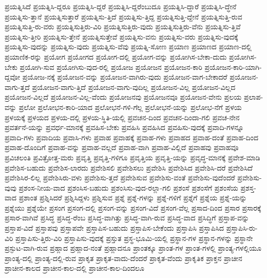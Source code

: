 {ಪ್ರಯತ್ನಿಸಿದೆ
ಪ್ರಯತ್ನಿಸಿ-ದ್ದರೂ
ಪ್ರಯತ್ನಿಸಿ-ದ್ದರೆ
ಪ್ರಯತ್ನಿಸಿ-ದ್ದರೆಂಬುದೂ
ಪ್ರಯತ್ನಿಸಿ-ದ್ದಾರೆ
ಪ್ರಯತ್ನಿಸಿ-ದ್ಧೇನೆ
ಪ್ರಯತ್ನಿಸು-ತ್ತಾನೆ
ಪ್ರಯತ್ನಿಸುತ್ತಾರೆ
ಪ್ರಯತ್ನಿಸು-ತ್ತಿದೆ
ಪ್ರಯತ್ನಿಸು-ತ್ತಿದ್ದ
ಪ್ರಯತ್ನಿಸುತ್ತಿ-ದ್ದೇನೆ
ಪ್ರಯತ್ನಿಸುತ್ತಿ-ರುವ
ಪ್ರಯತ್ನಿಸುತ್ತಿ-ರು-ವರು
ಪ್ರಯತ್ನಿಸುತ್ತಿರು-ವಿರಿ
ಪ್ರಯತ್ನಿಸುತ್ತಿರು-ವುದು
ಪ್ರಯತ್ನಿಸುತ್ತಿರು-ವೆನು
ಪ್ರಯತ್ನಿಸು-ತ್ತಿವೆ
ಪ್ರಯತ್ನಿಸು-ತ್ತೀರಿ
ಪ್ರಯತ್ನಿಸು-ತ್ತೇನೆ
ಪ್ರಯತ್ನಿಸುತ್ತೇವೆ
ಪ್ರಯತ್ನಿಸು-ವನು
ಪ್ರಯತ್ನಿಸು-ವರು
ಪ್ರಯತ್ನಿಸು-ವುದಕ್ಕೆ
ಪ್ರಯತ್ನಿಸು-ವುದನ್ನು
ಪ್ರಯತ್ನಿಸು-ವುದು
ಪ್ರಯತ್ನಿಸು-ವೆವು
ಪ್ರಯತ್ನಿ-ಸೋಣ
ಪ್ರಯಾಣ
ಪ್ರಯಾಣದ
ಪ್ರಯಾಣ-ದಲ್ಲಿ
ಪ್ರಯಾಣಿಕ-ರನ್ನು
ಪ್ರಯೋಗ
ಪ್ರಯೋಗದ
ಪ್ರಯೋಗ-ದಲ್ಲಿ
ಪ್ರಯೋಗ-ವನ್ನು
ಪ್ರಯೋಗಿಸ-ಬೇಕಾ-ದುದು
ಪ್ರಯೋಗಿಸ-ಬೇಕು
ಪ್ರಯೋಗಿ-ಸುವ
ಪ್ರಯೋಗಿಸು-ವುದ-ರಲ್ಲಿ
ಪ್ರಯೋಜ
ಪ್ರಯೋಜನ
ಪ್ರಯೋಜನ-ಕಾರಿ
ಪ್ರಯೋಜನ-ಕಾರಿ-ಯಾಗಿ-ದ್ದವೋ
ಪ್ರಯೋಜ-ನಕ್ಕೆ
ಪ್ರಯೋಜನ-ವನ್ನು
ಪ್ರಯೋಜನ-ವಾಗಿರು-ವುದು
ಪ್ರಯೋಜನ-ವಾಗ-ಬೇಕಾದರೆ
ಪ್ರಯೋಜನ-ವಾಗು-ತ್ತದೆ
ಪ್ರಯೋಜನ-ವಾಗು-ತ್ತಿದೆ
ಪ್ರಯೋಜನ-ವಾಗು-ವುದಿಲ್ಲ
ಪ್ರಯೋಜನ-ವಿಲ್ಲ
ಪ್ರಯೋಜನ-ವಿಲ್ಲದ
ಪ್ರಯೋಜನ-ವಿಲ್ಲದೆ
ಪ್ರಯೋಜನ-ವಿಲ್ಲ-ವೆಂದು
ಪ್ರಯೋಜನವು
ಪ್ರಯೋಜನವೂ
ಪ್ರಯೋಜನ-ವೇನು
ಪ್ರಲಯ
ಪ್ರಲಾಪ-ವನ್ನು
ಪ್ರಲೋ
ಪ್ರಲೋಭನ-ಕಾರಿ-ಯಾದ
ಪ್ರಲೋಭನೆ-ಗಳಿ-ಗೆಲ್ಲ
ಪ್ರಲೋಭನೆ-ಯನ್ನು
ಪ್ರಲೋಭ-ನೆಗೆ
ಪ್ರಳಯ
ಪ್ರಳಯಕ್ಕೆ
ಪ್ರಳಯದ
ಪ್ರಳಯ-ದಲ್ಲಿ
ಪ್ರಳಯ-ಸ್ಥಿತಿ-ಯಲ್ಲಿ
ಪ್ರವಚನ-ದಿಂದ
ಪ್ರವಚನ-ದಿಂದಾ-ಗಲಿ
ಪ್ರವಚ-ನೇನ
ಪ್ರವರ್ತನೆ-ಯನ್ನು
ಪ್ರವರ್ಧ-ಮಾನಕ್ಕೆ
ಪ್ರವಹಿಸ-ಬೇಕು
ಪ್ರವಹಿಸಿ
ಪ್ರವಹಿಸಿದ
ಪ್ರವಹಿಸು-ವುದಕ್ಕೆ
ಪ್ರವಾದಿ-ಗಳನ್ನೂ
ಪ್ರವಾದಿ-ಗಳು
ಪ್ರವಾದಿಯ
ಪ್ರವಾಸಿ-ಗಳು
ಪ್ರವಾಹ
ಪ್ರವಾಹಕ್ಕೆ
ಪ್ರವಾಹ-ಗಳು
ಪ್ರವಾಹದ
ಪ್ರವಾಹ-ದಂತೆ
ಪ್ರವಾಹ-ದಿಂದ
ಪ್ರವಾಹ-ದೊಂದಿಗೆ
ಪ್ರವಾಹ-ವನ್ನು
ಪ್ರವಾಹ-ವಲ್ಲದೆ
ಪ್ರವಾಹ-ವಾಗಿ
ಪ್ರವಾಹ-ವಿಲ್ಲಿದೆ
ಪ್ರವಾಹವು
ಪ್ರವಾಹವೂ
ಪ್ರವಿಚಲಂತಿ
ಪ್ರವಿತ್ರೋತ್ತ-ಮರು
ಪ್ರವೃತ್ತಿ
ಪ್ರವೃತ್ತಿ-ಗಳಿಗೂ
ಪ್ರವೃತ್ತಿಯ
ಪ್ರವೃತ್ತಿ-ಯನ್ನು
ಪ್ರವೃದ್ಧ-ಮಾನಕ್ಕೆ
ಪ್ರವೇಶ-ಮಾಡಿ
ಪ್ರವೇಶಿಸ-ಬಹುದು
ಪ್ರವೇಶಿಸ-ಲಾರದು
ಪ್ರವೇಶಿಸಲಿ
ಪ್ರವೇಶಿಸಲು
ಪ್ರವೇಶಿಸಿ
ಪ್ರವೇಶಿಸಿದ
ಪ್ರವೇಶಿಸಿ-ದರೆ
ಪ್ರವೇಶಿಸಿದೆ
ಪ್ರವೇಶಿಸಿರ-ಲಿಲ್ಲ
ಪ್ರವೇಶಿಸಿರು-ವಳು
ಪ್ರವೇಶಿಸು-ತ್ತದೆ
ಪ್ರವೇಶಿಸುವ
ಪ್ರವೇಶಿಸು-ವಂತೆ
ಪ್ರವೇಶಿಸು-ವುದೆಂದರೆ
ಪ್ರವೇಶಿಸು-ವುವು
ಪ್ರಶಂಸ-ನೀಯ-ವಾದ
ಪ್ರಶಂಸಿಸ-ಬಹುದು
ಪ್ರಶಂಸಿಸು-ವುದ-ರಲ್ಲಾ-ಗಲಿ
ಪ್ರಶಂಸೆ
ಪ್ರಶಂಸೆಗೆ
ಪ್ರಶಂಸೆಯ
ಪ್ರಶಸ್ತ-ವಾದ
ಪ್ರಶಾಂತ
ಪ್ರಶ್ನಿಸಿದರೆ
ಪ್ರಶ್ನಿಸಿದ್ದಳು
ಪ್ರಶ್ನಿಸುವ
ಪ್ರಶ್ನೆ
ಪ್ರಶ್ನೆ-ಗಳನ್ನು
ಪ್ರಶ್ನೆ-ಗಳಿಗೆ
ಪ್ರಶ್ನೆಗೆ
ಪ್ರಶ್ನೆಯ
ಪ್ರಶ್ನೆ-ಯನ್ನು
ಪ್ರಶ್ನೆಯು
ಪ್ರಶ್ನೆಯೇ
ಪ್ರಸಂಗ
ಪ್ರಸಂಗ-ದಲ್ಲಿ
ಪ್ರಸಂಗ-ವನ್ನು
ಪ್ರಸಂಗ-ವಿದೆ
ಪ್ರಸಂಗ-ವೆಲ್ಲ
ಪ್ರಸಾದ-ದಿಂದ
ಪ್ರಸಾರ
ಪ್ರಸಾರಕ್ಕೆ
ಪ್ರಸಾರ-ವಾಗಿವೆ
ಪ್ರಸಿದ್ಧ
ಪ್ರಸಿದ್ಧ-ರೆಂಬ
ಪ್ರಸಿದ್ಧ-ವಾಗಿತ್ತು
ಪ್ರಸಿದ್ಧ-ವಾಗಿ-ರುವ
ಪ್ರಸಿದ್ಧ-ವಾದ
ಪ್ರಸಿದ್ಧಿಗೆ
ಪ್ರಸ್ತಾಪ-ವನ್ನು
ಪ್ರಸ್ತಾಪ-ವಿದೆ
ಪ್ರಸ್ತಾಪವು
ಪ್ರಸ್ತಾಪವೇ
ಪ್ರಸ್ತಾಪಿಸ-ಬಹುದು
ಪ್ರಸ್ತಾಪಿಸ-ಬೇಕೆಂದು
ಪ್ರಸ್ತಾಪಿಸಿ
ಪ್ರಸ್ತಾಪಿಸಿದ
ಪ್ರಸ್ತಾಪಿಸಿ-ರು-ವಿರಿ
ಪ್ರಸ್ತಾಪಿಸು-ತ್ತಿರು-ವಿರಿ
ಪ್ರಸ್ತಾಪಿಸು-ವುದಕ್ಕೆ
ಪ್ರಸ್ತುತ
ಪ್ರಸ್ಥ-ಭೂಮಿ-ಯಲ್ಲಿ
ಪ್ರಸ್ಥಾನ-ಗಳ
ಪ್ರಸ್ಥಾನ-ಗಳನ್ನು
ಪ್ರಸ್ಥಾನೇ
ಪ್ರಸ್ಫುಟ-ವಾಗಿ-ರುವ
ಪ್ರಹ್ಲಾದ
ಪ್ರಹ್ಲಾದ-ನಂತೆ
ಪ್ರಹ್ಲಾದನೂ
ಪ್ರಾಂತಕ್ಕೂ
ಪ್ರಾಂತ-ಗಳ
ಪ್ರಾಂತ-ಗಳಲ್ಲಿ
ಪ್ರಾಂತ್ಯ-ಗಳಲ್ಲಿಯೂ
ಪ್ರಾಂತ್ಯ-ದಲ್ಲಿ
ಪ್ರಾಂತ್ಯ-ದಲ್ಲಿ-ರುವ
ಪ್ರಾಕೃತ
ಪ್ರಾಕೃತ-ವಾದು-ದೆಂದರೆ
ಪ್ರಾಕೃತ-ವೆಂದು
ಪ್ರಾಕೃತಿಕ
ಪ್ರಾಕ್ತನ
ಪ್ರಾಚೀನ
ಪ್ರಾಚೀನ-ಕಾಲದ
ಪ್ರಾಚೀನ-ಕಾಲ-ದಲ್ಲಿ
ಪ್ರಾಚೀನ-ಕಾಲ-ದಿಂದಲೂ
}
